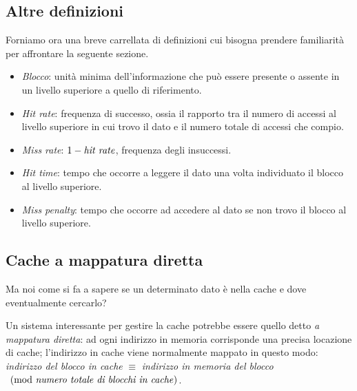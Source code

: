 \documentclass[class=book, crop=false, oneside]{standalone}
\begin{document}
\subsection*{Altre definizioni}
Forniamo ora una breve carrellata di definizioni cui bisogna prendere familiarità per affrontare la seguente sezione.
\begin{itemize}
  \item \emph{Blocco}: unità minima dell'informazione che può essere presente o assente in un livello superiore a quello di riferimento.
  \item \emph{Hit rate}: frequenza di successo, ossia il rapporto tra il numero di accessi al livello superiore in cui trovo il dato e il numero totale di accessi che compio.
  \item \emph{Miss rate}: \(1 - \textrm{\emph{hit rate}}\), frequenza degli insuccessi.
  \item \emph{Hit time}: tempo che occorre a leggere il dato una volta individuato il blocco al livello superiore.
  \item \emph{Miss penalty}: tempo che occorre ad accedere al dato se non trovo il blocco al livello superiore.
\end{itemize}

\subsection{Cache a mappatura diretta}\label{sec:direttamente}
Ma noi come si fa a sapere se un determinato dato è nella cache e dove eventualmente cercarlo?

Un sistema interessante per gestire la cache potrebbe essere quello detto \emph{a mappatura diretta}: ad ogni indirizzo in memoria corrisponde una precisa locazione di cache; l'indirizzo in cache viene normalmente mappato in questo modo: \emph{indirizzo del blocco in cache} \(\equiv\) \emph{indirizzo in memoria del blocco}  \(\pmod{\textrm{\emph{numero totale di blocchi in cache}}}\).
\end{document}
